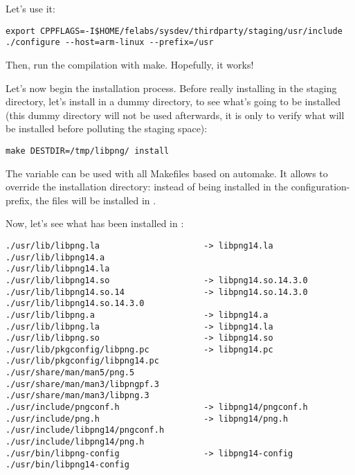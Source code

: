 Let's use it:

\begin{verbatim}
export CPPFLAGS=-I$HOME/felabs/sysdev/thirdparty/staging/usr/include
./configure --host=arm-linux --prefix=/usr
\end{verbatim}

Then, run the compilation with make. Hopefully, it works!

Let's now begin the installation process.  Before really installing in
the staging directory, let's install in a dummy directory, to see
what's going to be installed (this dummy directory will not be used
afterwards, it is only to verify what will be installed before
polluting the staging space):

\begin{verbatim}
make DESTDIR=/tmp/libpng/ install
\end{verbatim}

The  variable can be used with all Makefiles based on
automake. It allows to override the installation directory: instead of
being installed in the configuration-prefix, the files will be
installed in .

Now, let's see what has been installed in :

\begin{verbatim}
./usr/lib/libpng.la                     -> libpng14.la
./usr/lib/libpng14.a
./usr/lib/libpng14.la
./usr/lib/libpng14.so                   -> libpng14.so.14.3.0
./usr/lib/libpng14.so.14                -> libpng14.so.14.3.0
./usr/lib/libpng14.so.14.3.0
./usr/lib/libpng.a                      -> libpng14.a
./usr/lib/libpng.la                     -> libpng14.la
./usr/lib/libpng.so                     -> libpng14.so
./usr/lib/pkgconfig/libpng.pc           -> libpng14.pc
./usr/lib/pkgconfig/libpng14.pc
./usr/share/man/man5/png.5
./usr/share/man/man3/libpngpf.3
./usr/share/man/man3/libpng.3
./usr/include/pngconf.h                 -> libpng14/pngconf.h
./usr/include/png.h                     -> libpng14/png.h
./usr/include/libpng14/pngconf.h
./usr/include/libpng14/png.h
./usr/bin/libpng-config                 -> libpng14-config
./usr/bin/libpng14-config
\end{verbatim}

